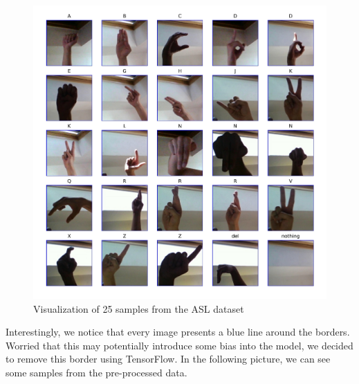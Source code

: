 \documentclass{Configuration_Files/PoliMi3i_thesis}
\begin{document}
\begin{figure}[H]
    \centering
    \includegraphics[width=\textwidth]{Figures/eda/asl_samples.jpg}
    \caption{Visualization of 25 samples from the ASL dataset}
    \label{fig:asl_raw}
\end{figure}

Interestingly, we notice that every image presents a blue line around the borders. Worried that this may potentially introduce some bias into the model, we decided to remove this border using TensorFlow. In the following picture, we can see some samples from the pre-processed data.
\end{document}
